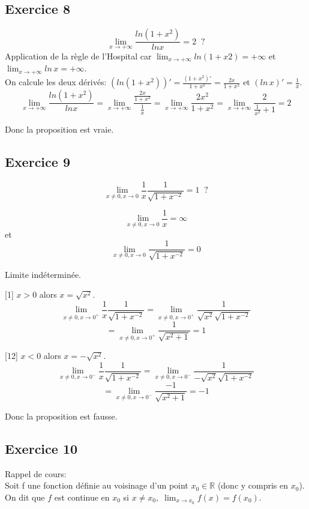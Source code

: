 \documentclass[]{book}
\theoremstyle{definition}
\newcommand{\bb}[1]{\mathbb{#1}}
\newcommand{\R}{\bb{R}}
\begin{document}
\subsection*{Exercice 8}
$$\lim_{x \to +\infty} \frac{ln(1+x^2)}{ln x} = 2 \;\;?$$
Application de la r\`egle de l'Hospital car $\lim_{x \to +\infty} ln(1+x2) = +\infty$ et $\lim_{x \to +\infty} ln\, x = +\infty$.\\

On calcule les deux d\'eriv\'es: $(ln(1+x^2))' = \frac{(1+x^2)'}{1+x^2} = \frac{2x}{1+x^2}$ et $(ln\, x)' = \frac{1}{x}$.
$$ \lim_{x \to +\infty} \frac{ln(1+x^2)}{ln x} = \lim_{x \to +\infty} \frac{\frac{2x}{1+x^2}}{\frac{1}{x}} = \lim_{x \to +\infty} \frac{2x^2}{1+x^2} = \lim_{x \to +\infty} \frac{2}{\frac{1}{x^2}+1} = 2$$


Donc la proposition est vraie.

\subsection*{Exercice 9}
$$ \lim_{x \neq 0, x \to 0} \frac{1}{x} \frac{1}{\sqrt{1+x^{-2}}}= 1 \;\;?$$

$$\lim_{x \neq 0,x \to 0} \frac{1}{x} = \infty$$
et 
$$\lim_{x \neq 0,x \to 0} \frac{1}{\sqrt{1+x^{-2}}} = 0$$

Limite ind\'etermin\'ee.

[1] $x>0$ alors $x = \sqrt{x^2}$.
$$ \lim_{x \neq 0, x \to 0^{+}} \frac{1}{x} \frac{1}{\sqrt{1+x^{-2}}} = \lim_{x \neq 0, x \to 0^{+}} \frac{1}{\sqrt{x^2}\sqrt{1+x^{-2}}}$$
$$ = \lim_{x \neq 0, x \to 0^{+}} \frac{1}{\sqrt{x^2+1}} = 1$$



[12] $x<0$ alors $x = -\sqrt{x^2}$.
$$ \lim_{x \neq 0, x \to 0^{-}} \frac{1}{x} \frac{1}{\sqrt{1+x^{-2}}} = \lim_{x \neq 0, x \to 0^{-}} \frac{1}{-\sqrt{x^2}\sqrt{1+x^{-2}}}$$
$$ = \lim_{x \neq 0, x \to 0^{-}} \frac{-1}{\sqrt{x^2+1}} = -1$$



Donc la proposition est fausse.


\subsection*{Exercice 10}
Rappel de cours:\\
Soit f une fonction d\'efinie au voisinage d'un point $x_0 \in \R$ (donc y compris en
$x_0$). On dit que $f$ est continue en $x_0$ si $x \ne x_0,\;\lim_{x \to x_0} f(x) = f(x_0)$.
\end{document}
